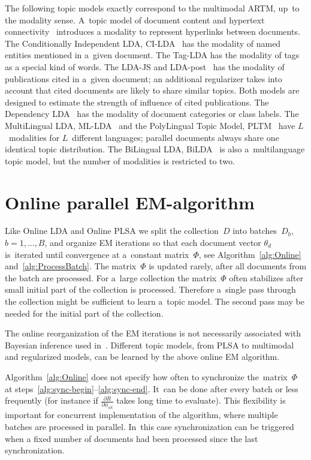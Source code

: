 \documentclass{acm_proc_article-sp}
\begin{document}
The following topic models exactly correspond to the multimodal ARTM,
up~to the modality sense.
A~topic model of document content and hypertext connectivity~\cite{cohn00missing}
introduces a modality to represent hyperlinks between documents.
The Conditionally Independent LDA, CI-LDA~\cite{newman06entity}
has the modality of named entities mentioned in a~given document.
The Tag-LDA \cite{si09taglda}
has the modality of tags as a special kind of words.
The LDA-JS and LDA-post~\cite{dietz07unsupervised}
has the modality of publications cited in a~given document;
an additional regularizer takes into account that cited documents are likely to share similar topics.
Both models are designed to estimate the strength of influence of cited publications.
The Dependency LDA~\cite{rubin12statistical}
has the modality of document categories or class labels.
The MultiLingual LDA, ML-LDA~\cite{ni09mining} and
the PolyLingual Topic Model, PLTM~\cite{mimno09polylingual}
have $L$~modalities for $L$~different languages;
parallel documents always share one identical topic distribution.
The BiLingual LDA, BiLDA~\cite{smet09weblinking}
is also a~multilanguage topic model, but the number of modalities is restricted to two.


\section{Online parallel EM-algorithm}
\label{sec:Online}

Like Online LDA \cite{hoffman10online} and Online PLSA \cite{bassiou14online}
we split the collection~$D$ into batches~$D_b$, ${b=1,\dots,B}$,
and organize EM iterations so that
each document vector $\theta_d$ is~iterated until convergence at a~constant matrix~$\Phi$,
see Algorithm~\ref{alg:Online} and~\ref{alg:ProcessBatch}.
The matrix~$\Phi$ is updated rarely, after all documents from the batch are processed.
For a~large collection
the matrix~$\Phi$ often stabilizes after small initial part of the collection is processed.
Therefore a~single pass through the collection might be sufficient to learn a~topic model.
The second pass may be needed for the initial part of the collection.

The online reorganization of the EM iterations
is not necessarily associated with Bayesian inference used in~\cite{hoffman10online}.
Different topic models, from PLSA to multimodal and regularized models,
can be learned by the above online EM algorithm.

Algorithm~\ref{alg:Online} does not specify how often to synchronize the~matrix~$\Phi$
at steps~\ref{alg:sync-begin}--\ref{alg:sync-end}.
It~can be done after every batch or less frequently
(for instance if $\frac{\partial R}{\partial \phi_{wt}}$ takes long time to evaluate).
This flexibility is important for concurrent implementation of the algorithm,
where multiple batches are processed in parallel.
In~this case synchronization can be triggered when a fixed number of documents had been processed since the last synchronization.
\end{document}
